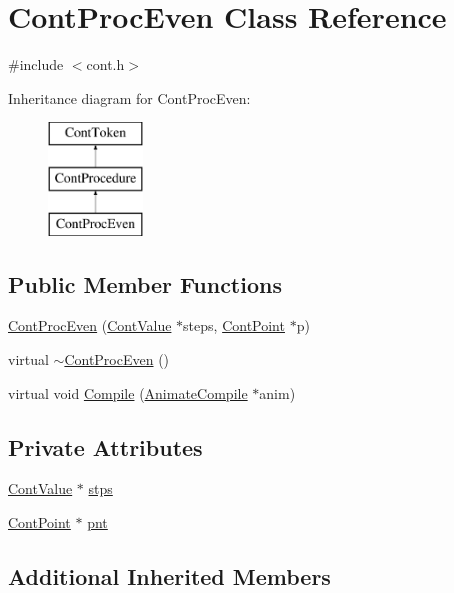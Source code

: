 \hypertarget{a00068}{\section{Cont\-Proc\-Even Class Reference}
\label{a00068}
}


{\ttfamily \#include $<$cont.\-h$>$}

Inheritance diagram for Cont\-Proc\-Even\-:\begin{figure}[H]
\begin{center}
\leavevmode
\includegraphics[height=3.000000cm]{a00068}
\end{center}
\end{figure}
\subsection*{Public Member Functions}
\begin{DoxyCompactItemize}
\item 
\hyperlink{a00068_afdb53d03002a8103359eefd4c8a69d8f}{Cont\-Proc\-Even} (\hyperlink{a00086}{Cont\-Value} $\ast$steps, \hyperlink{a00062}{Cont\-Point} $\ast$p)
\item 
virtual \hyperlink{a00068_a0c6ba8bbe36a81154d3290ab56682a44}{$\sim$\-Cont\-Proc\-Even} ()
\item 
virtual void \hyperlink{a00068_afdf570f6d03a29b5743c4ecec8bbd416}{Compile} (\hyperlink{a00007}{Animate\-Compile} $\ast$anim)
\end{DoxyCompactItemize}
\subsection*{Private Attributes}
\begin{DoxyCompactItemize}
\item 
\hyperlink{a00086}{Cont\-Value} $\ast$ \hyperlink{a00068_aa05efb6bad22228ea0d6e7234f2f7b4f}{stps}
\item 
\hyperlink{a00062}{Cont\-Point} $\ast$ \hyperlink{a00068_a5f29bd5f2ada87f5b657f8494ed36afa}{pnt}
\end{DoxyCompactItemize}
\subsection*{Additional Inherited Members}


